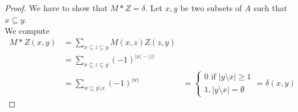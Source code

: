 \documentclass[../main.tex]{subfiles}
\begin{document}
\begin{proof}
We have to show that $M \ast Z = \delta$. Let $x,y$ be two subsets of $A$ such that $x \subseteq y$.\\
We compute
\begin{align*}
	M \ast Z ( x,y)  &= \sum_{x \subseteq z \subseteq y}^{ } M( x,z) Z( z,y) \\
			 &= \sum_{x \subseteq z \subseteq  y}^{ } ( -1) ^{|x| - |z| }\\
			 &= \sum_{w \subseteq y \setminus x }^{ } ( -1)^{|w|}
			 &=
			 \begin{cases}
			 0 \text{ if }  |y \setminus x| \geq 1\\
			 1, |y\setminus x| = \emptyset
			 \end{cases}
			 = \delta( x,y) 
\end{align*}

\end{proof}












		
\end{document}
